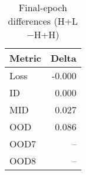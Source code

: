\begin{table}[t]
\centering
\begin{tabular}{lr}
\hline
Metric & Delta \\
\hline
Loss & -0.000 \\
ID & 0.000 \\
MID & 0.027 \\
OOD & 0.086 \\
OOD7 & -- \\
OOD8 & -- \\
\hline
\end{tabular}
\caption{Final-epoch differences (H+L$-$H+H)}
\label{tab:diff}
\end{table}
